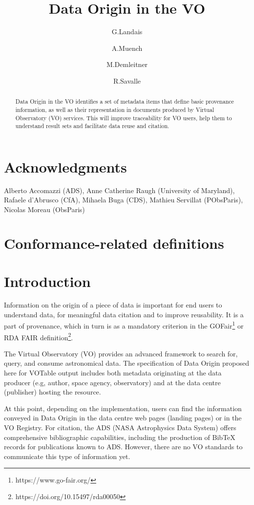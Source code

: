 \documentclass[11pt,a4paper]{ivoa}
\title{Data Origin in the VO}
\author{G.Landais}
\author{A.Muench}
\author{M.Demleitner}
\author{R.Savalle}
\begin{document}
\begin{abstract}
Data Origin in the VO identifies a set of metadata items that define basic
provenance information, as well as their representation in documents produced
by Virtual Observatory (VO) services.  This will improve traceability for VO
users, help them to understand result sets and facilitate data reuse and citation.

\end{abstract}


\section*{Acknowledgments}
Alberto Accomazzi (ADS), Anne Catherine Raugh (University of Maryland), Rafaele d'Abrusco (CfA), Mihaela Buga (CDS), Mathieu Servillat (PObsParis), Nicolas Moreau (ObsParis)

\section*{Conformance-related definitions}


\section{Introduction}

Information on the origin of a piece of data is important for end users to understand data, for meaningful data citation and to improve reusability.  It is a part of provenance, which in turn is as a mandatory criterion in the GOFair\footnote{https://www.go-fair.org/} or RDA FAIR definition\footnote{https://doi.org/10.15497/rda00050}.

The Virtual Observatory (VO) provides an advanced framework to search for, query, and consume astronomical data.  The specification of Data Origin proposed here for VOTable output includes both metadata originating at the data producer (e.g, author, space agency, observatory) and at the data centre (publisher) hosting the resource.

At this point, depending on the implementation, users can find the information conveyed in Data Origin in the data centre web pages (landing pages) or in the VO Registry.  For citation, the ADS (NASA Astrophysics Data System) offers comprehensive bibliographic capabilities, including the production of BibTeX records for publications known to ADS. However, there are no VO standards to communicate this type of information yet.
\end{document}
